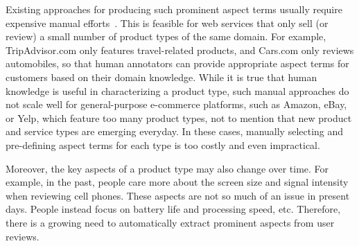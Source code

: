 
Existing approaches for producing such prominent aspect terms usually require expensive manual efforts~\cite{poria2014rule,DBLP:journals/coling/QiuLBC11}. This is feasible for web services that only 
sell (or review) a small number of  product types of the same domain. 
For example, TripAdvisor.com only features travel-related products, 
and Cars.com only reviews automobiles, so that human annotators can provide 
appropriate aspect terms for customers based on their domain knowledge.  
While it is true that human knowledge is useful
in characterizing a product type,
such manual approaches do not scale well for 
general-purpose e-commerce platforms, such as Amazon, eBay,  
or Yelp, which feature too many product types, 
not to mention that new product and service types are emerging 
everyday.  
In these cases, manually selecting and pre-defining 
aspect terms for each type is too costly and even impractical.

Moreover, the key aspects of a product type may also change over time. 
For example, in the past, people care more about the screen 
size and signal intensity when reviewing cell phones. 
These aspects are not so much of an issue in present days. 
People instead focus on battery life and processing speed, etc.
Therefore, there is a growing need to automatically extract prominent 
aspects from user reviews.


%

